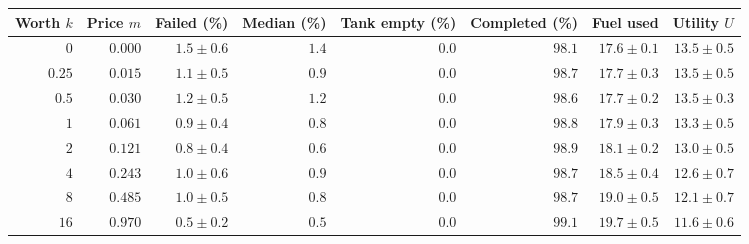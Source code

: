 \begin{tabular}{@{}rrrrrrrr@{}}
\toprule
Worth $k$ & Price $m$ & Failed (\%) & Median (\%) & Tank empty (\%) & Completed (\%) & Fuel used & Utility $U$ \\
\midrule
$0$ & $0.000$ & $1.5\pm0.6$ & $1.4$ & $0.0$ & $98.1$ & $17.6\pm0.1$ & $13.5\pm0.5$ \\
$0.25$ & $0.015$ & $1.1\pm0.5$ & $0.9$ & $0.0$ & $98.7$ & $17.7\pm0.3$ & $13.5\pm0.5$ \\
$0.5$ & $0.030$ & $1.2\pm0.5$ & $1.2$ & $0.0$ & $98.6$ & $17.7\pm0.2$ & $13.5\pm0.3$ \\
$1$ & $0.061$ & $0.9\pm0.4$ & $0.8$ & $0.0$ & $98.8$ & $17.9\pm0.3$ & $13.3\pm0.5$ \\
$2$ & $0.121$ & $0.8\pm0.4$ & $0.6$ & $0.0$ & $98.9$ & $18.1\pm0.2$ & $13.0\pm0.5$ \\
$4$ & $0.243$ & $1.0\pm0.6$ & $0.9$ & $0.0$ & $98.7$ & $18.5\pm0.4$ & $12.6\pm0.7$ \\
$8$ & $0.485$ & $1.0\pm0.5$ & $0.8$ & $0.0$ & $98.7$ & $19.0\pm0.5$ & $12.1\pm0.7$ \\
$16$ & $0.970$ & $0.5\pm0.2$ & $0.5$ & $0.0$ & $99.1$ & $19.7\pm0.5$ & $11.6\pm0.6$ \\
\bottomrule
\end{tabular}

